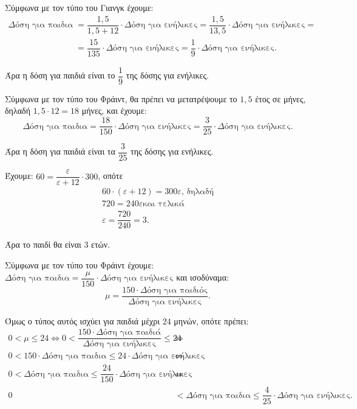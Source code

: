 
\begin{alist}
\item Σύμφωνα με τον τύπο του Γιανγκ έχουμε:
\begin{align*}
\Delta\text{όση για παιδια} &= \dfrac{1,5}{1,5 + 12} \cdot \Delta\text{όση για ενήλικες} = \dfrac{1,5}{13,5} \cdot \Delta\text{όση για ενήλικες} =\\&= \dfrac{15}{135} \cdot \Delta\text{όση για ενήλικες} = \dfrac{1}{9} \cdot \Delta\text{όση για ενήλικες}.
\end{align*}

Άρα η δόση για παιδιά είναι το $\dfrac{1}{9}$ της δόσης για ενήλικες.

Σύμφωνα με τον τύπο του Φράιντ, θα πρέπει να μετατρέψουμε το $1,5$ έτος σε μήνες, δηλαδή
$1,5 \cdot 12 = 18$ μήνες, και έχουμε:
\[\Delta\text{όση για παιδια} = \dfrac{18}{150} \cdot \Delta\text{όση για ενήλικες} = \dfrac{3}{25} \cdot \Delta\text{όση για ενήλικες}.\]

Άρα η δόση για παιδιά είναι τα $\dfrac{3}{25}$ της δόσης για ενήλικες.

\item
\begin{rlist}
\item Έχουμε: $60 = \dfrac{\varepsilon}{\varepsilon + 12} \cdot 300$, οπότε
\begin{gather*}
60 \cdot (\varepsilon + 12) = 300\varepsilon\text{, δηλαδή} \\
720 = 240\varepsilon\text{και τελικά} \\
\varepsilon = \dfrac{720}{240} = 3.
\end{gather*}

Άρα το παιδί θα είναι $3$ ετών.
\item Σύμφωνα με τον τύπο του Φράιντ έχουμε:
$\Delta\text{όση για παιδια} = \dfrac{\mu}{150} \cdot \Delta\text{όση για ενήλικες}$ και ισοδύναμα:
\[\mu = \dfrac{150 \cdot \Delta\text{όση για παιδιός}}{\Delta\text{όση για ενήλικες}}.\]

Όμως ο τύπος αυτός ισχύει για παιδιά μέχρι $24$ μηνών, οπότε πρέπει:
\begin{align*}
0 < \mu \le 24 \Leftrightarrow 0 < \dfrac{150 \cdot \Delta\text{όση για παιδιά}}{\Delta\text{όση για ενήλικες}} \le 24 \ &\Leftrightarrow \\
0 < 150 \cdot \Delta\text{όση για παιδια} \le 24 \cdot \Delta\text{όση για ενήλικες} \ &\Leftrightarrow \\
0 < \Delta\text{όση για παιδια} \le \dfrac{24}{150} \cdot \Delta\text{όση για ενήλικες} \ &\Leftrightarrow \\
0 &< \Delta\text{όση για παιδια} \le \dfrac{4}{25} \cdot \Delta\text{όση για ενήλικες}.
\end{align*}


\end{rlist}
\end{alist}
